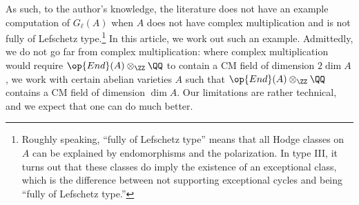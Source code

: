 \documentclass[openany]{book}
\begin{document}
As such, to the author's knowledge, the literature does not have an example computation of $G_\ell(A)$ when $A$ does not have complex multiplication and is not fully of Lefschetz type.\footnote{Roughly speaking, ``fully of Lefschetz type'' means that all Hodge classes on $A$ can be explained by endomorphisms and the polarization. In type III, it turns out that these classes do imply the existence of an exceptional class, which is the difference between not supporting exceptional cycles and being ``fully of Lefschetz type.''} In this article, we work out such an example. Admittedly, we do not go far from complex multiplication: where complex multiplication would require $\op{End}(A)\otimes_\ZZ\QQ$ to contain a CM field of dimension $2\dim A$, we work with certain abelian varieties $A$ such that $\op{End}(A)\otimes_\ZZ\QQ$ contains a CM field of dimension $\dim A$. Our limitations are rather technical, and we expect that one can do much better.
\end{document}
